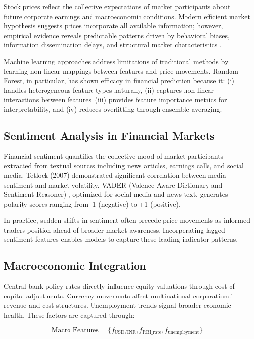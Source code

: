 \documentclass[conference]{IEEEtran}
\begin{document}
Stock prices reflect the collective expectations of market participants about future corporate earnings and macroeconomic conditions. Modern efficient market hypothesis suggests prices incorporate all available information; however, empirical evidence reveals predictable patterns driven by behavioral biases, information dissemination delays, and structural market characteristics \cite{patel2015predicting}.

Machine learning approaches address limitations of traditional methods by learning non-linear mappings between features and price movements. Random Forest, in particular, has shown efficacy in financial prediction because it: (i) handles heterogeneous feature types naturally, (ii) captures non-linear interactions between features, (iii) provides feature importance metrics for interpretability, and (iv) reduces overfitting through ensemble averaging.

\subsection{Sentiment Analysis in Financial Markets}

Financial sentiment quantifies the collective mood of market participants extracted from textual sources including news articles, earnings calls, and social media. Tetlock (2007) demonstrated significant correlation between media sentiment and market volatility. VADER (Valence Aware Dictionary and Sentiment Reasoner) \cite{hutto2014vader}, optimized for social media and news text, generates polarity scores ranging from -1 (negative) to +1 (positive).

In practice, sudden shifts in sentiment often precede price movements as informed traders position ahead of broader market awareness. Incorporating lagged sentiment features enables models to capture these leading indicator patterns.

\subsection{Macroeconomic Integration}

Central bank policy rates directly influence equity valuations through cost of capital adjustments. Currency movements affect multinational corporations' revenue and cost structures. Unemployment trends signal broader economic health. These factors are captured through:

\begin{equation}
\text{Macro\_Features} = \{f_{\text{USD/INR}}, f_{\text{RBI\_rate}}, f_{\text{unemployment}}\}
\end{equation}
\end{document}
